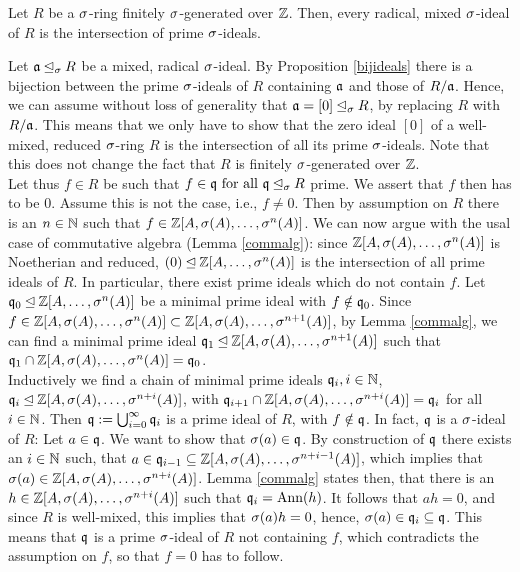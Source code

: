 \begin{prop}\label{mixedintersectionprimesfinite}
Let $R$ be a $\sigma$-ring finitely $\sigma$-generated over $\mathbb{Z}$. Then, every radical, mixed $\sigma$-ideal of $R$ is the intersection of prime $\sigma$-ideals.
\begin{bew}
Let $\mathfrak{a} \unlhd_{\sigma} R$ be a mixed, radical $\sigma$-ideal. By Proposition \ref{bijideals} there is a bijection between the prime $\sigma$-ideals of $R$ containing $\mathfrak{a}$ and those of $R/\mathfrak{a}$. Hence, we can assume without loss of generality that $\mathfrak{a} = [0] \unlhd_{\sigma} R$,
 by replacing $R$ with $R/\mathfrak{a}$. This means that we only have to show that the zero ideal $[0]$ of a well-mixed, reduced $\sigma$-ring $R$ is the intersection of all its prime $\sigma$-ideals. Note that this does not change the fact
that $R$ is finitely $\sigma$-generated over $\mathbb{Z}$. \\

\indent Let thus $f \in R$ be such that $f \in \mathfrak{q} \text{ for all } \mathfrak{q} \unlhd_{\sigma} R$ prime. We assert that $f$ then has to be $0$. Assume this is not the case, i.e., $f \neq 0$. Then by assumption on $R$ there is an $n \in \mathbb{N}$ such that $f \in \mathbb{Z}[A,\sigma(A),\ldots,\sigma^n(A)]$.
We can now argue with the usal case of commutative algebra (Lemma \ref{commalg}): since $\mathbb{Z}[A,\sigma(A),\ldots,\sigma^n(A)]$ is Noetherian and reduced, $(0) \unlhd \mathbb{Z}[A,\ldots,\sigma^n(A)]$ is the intersection of all prime ideals of $R$. In particular, there exist prime ideals which do not contain $f$.
Let $\mathfrak{q}_0 \unlhd \mathbb{Z}[A,\ldots,\sigma^n(A)]$ be a minimal prime ideal with $f \notin \mathfrak{q}_0$. Since $f \in \mathbb{Z}[A,\sigma(A),\ldots,\sigma^n(A)] \subset \mathbb{Z}[A,\sigma(A),\ldots,\sigma^{n+1}(A)]$, by Lemma \ref{commalg}, we can find a minimal prime ideal $\mathfrak{q}_1 \unlhd \mathbb{Z}[A,\sigma(A),\ldots,\sigma^{n+1}(A)]$
such that $\mathfrak{q}_1 \cap \mathbb{Z}[A,\sigma(A),\ldots,\sigma^{n}(A)] = \mathfrak{q}_0$. \\

\indent Inductively we find a chain of minimal prime ideals $\mathfrak{q}_i, i \in \mathbb{N}$, $\mathfrak{q}_i \unlhd \mathbb{Z}[A,\sigma(A),\ldots,\sigma^{n+i}(A)]$, with $\mathfrak{q}_{i+1} \cap \mathbb{Z}[A,\sigma(A),\ldots,\sigma^{n+i}(A)] = \mathfrak{q}_i$ for all $i \in \mathbb{N}$.
Then $\mathfrak{q} := \bigcup_{i=0}^{\infty} \mathfrak{q}_i$ is a prime ideal of $R$, with $f \notin \mathfrak{q}$. In fact, $\mathfrak{q}$ is a $\sigma$-ideal of $R$: Let $a \in \mathfrak{q}$. We want to show that $\sigma(a) \in \mathfrak{q}$. By construction of $\mathfrak{q}$ there exists an $i \in \mathbb{N}$ such,
that $a \in \mathfrak{q}_{i-1} \subseteq \mathbb{Z}[A,\sigma(A),\ldots,\sigma^{n+i-1}(A)]$, which implies that $\sigma(a) \in \mathbb{Z}[A,\sigma(A),\ldots,\sigma^{n+i}(A)]$. Lemma \ref{commalg} states then, that there is an $h \in \mathbb{Z}[A,\sigma(A),\ldots,\sigma^{n+i}(A)]$ such that $ \mathfrak{q}_i = \text{Ann}(h)$.
It follows that $ah = 0$, and since $R$ is well-mixed, this implies that $\sigma(a)h = 0$, hence, $\sigma(a) \in \mathfrak{q}_i \subseteq \mathfrak{q}$. This means that $\mathfrak{q}$ is a prime $\sigma$-ideal of $R$ not containing $f$, which contradicts the assumption on $f$, so that $f = 0$ has to follow.
\end{bew}
\end{prop}

